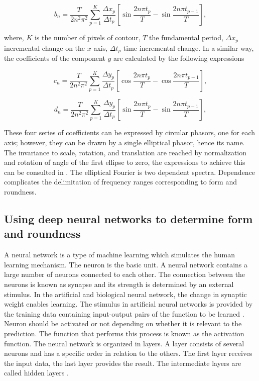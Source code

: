 \documentclass[conference]{IEEEtran}
\begin{document}
\begin{equation}
b_n = \frac{T}{2n^2\pi^2}\sum_{p = 1}^{K}\frac{\Delta x_p}{\Delta t_p}[\sin{\frac{2n\pi t_p}{T}} - \sin{\frac{2n\pi t_{p-1}}{T}}], \label{eq3}
\end{equation}

\noindent where, $K$ is the number of pixels of contour, \(T\) the fundamental period, \(\Delta x_p\) incremental change on the $x$ axis, \(\Delta t_p\) time incremental change. In a similar way, the coefficients of the component \(y\) are calculated by the following expressions

\begin{equation}
c_n = \frac{T}{2n^2\pi^2}\sum_{p = 1}^{K}\frac{\Delta y_p}{\Delta t_p}[\cos{\frac{2n\pi t_p}{T}} - \cos{\frac{2n\pi t_{p-1}}{T}}], \label{eq4}
\end{equation}

\begin{equation}
d_n = \frac{T}{2n^2\pi^2}\sum_{p = 1}^{K}\frac{\Delta y_p}{\Delta t_p}[\sin{\frac{2n\pi t_p}{T}} - \sin{\frac{2n\pi t_{p-1}}{T}}], \label{eq5}
\end{equation}

These four series of coefficients can be expressed by circular phasors, one for each axis; however, they can be drawn by a single elliptical phasor, hence its name. The invariance to scale, rotation, and translation are reached by normalization and rotation of angle of the first ellipse to zero, the expressions to achieve this can be consulted in \cite{b9}. The elliptical Fourier is two dependent spectra. Dependence complicates the delimitation of frequency ranges corresponding to form and roundness.

  
\subsection{Using deep neural networks to determine form and roundness}\label{AA}

A neural network is a type of machine learning which simulates the human learning mechanism. The neuron is the basic unit. A neural network contains a large number of neurons connected to each other. The connection between the neurons is known as synapse and its strength is determined by an external stimulus. In the artificial and biological neural network, the change in synaptic weight enables learning. The stimulus in artificial neural networks is provided by the training data containing input-output pairs of the function to be learned \cite{b10}. Neuron should be activated or not depending on whether it is relevant to the prediction. The function that performs this process is known as the activation function. The neural network is organized in layers. A layer consists of several neurons and has a specific order in relation to the others. The first layer receives the input data, the last layer provides the result. The intermediate layers are called hidden layers \cite{b11}.
\end{document}
